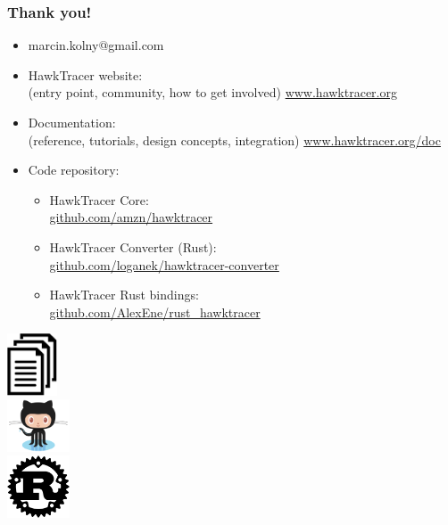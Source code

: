 \documentclass{beamer}
\begin{document}
\begin{frame}

  \frametitle{Thank you!}
  \fontsize{10pt}{1}\selectfont
  \begin{minipage}[c]{0.7\linewidth}
    \begin{itemize}
      \setlength\itemsep{0.8em}
      \item marcin.kolny@gmail.com
      \item HawkTracer website: \\
        {\scriptsize (entry point, community, how to get involved)}
        \href{https://www.hawktracer.org}{www.hawktracer.org} \\
      \item Documentation: \\
        {\scriptsize (reference, tutorials, design concepts, integration)}
        \href{https://www.hawktracer.org/doc}{www.hawktracer.org/doc}
      \item Code repository: \\
      \begin{itemize}
        \setlength\itemsep{0.8em}
        \item HawkTracer Core:\\
          \href{https://github.com/amzn/hawktracer}{github.com/amzn/hawktracer}
        \item HawkTracer Converter (Rust): \\
          \href{https://github.com/loganek/hawktracer-converter}{github.com/loganek/hawktracer-converter}
        \item HawkTracer Rust bindings: \\
        \href{https://github.com/AlexEne/rust\_hawktracer}{github.com/AlexEne/rust\_hawktracer}
      \end{itemize}
    \end{itemize}
  \end{minipage}
  \begin{minipage}[c]{0.25\linewidth}
    \begin{center}
      \vspace{1em}
      \includegraphics[width=4em]{img/documentation.png} \\
      \vspace{1.5em}
      \includegraphics[width=5em]{img/github.png} \\
      \vspace{1.5em}
      \includegraphics[width=5em]{img/rust.png}
    \end{center}
  \end{minipage}
\end{frame}
\end{document}
